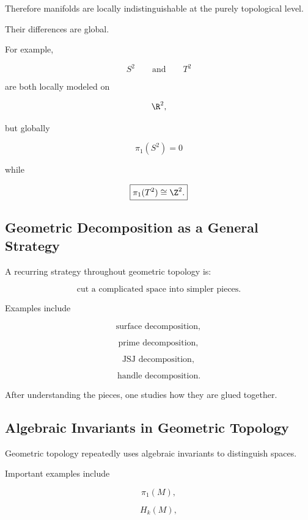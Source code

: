 Therefore manifolds are locally indistinguishable at the purely topological
level.

Their differences are global.

For example,

\[
S^2
\qquad\text{and}\qquad
T^2
\]

are both locally modeled on

\[
\R^2,
\]

but globally

\[
\boxed{
\pi_1(S^2)=0
}
\]

while

\[
\boxed{
\pi_1(T^2)\cong\Z^2.
}
\]

\subsection{Geometric Decomposition as a General Strategy}
\label{subsec:geometric-decomposition-strategy}

A recurring strategy throughout geometric topology is:

\[
\boxed{
\text{cut a complicated space into simpler pieces}.
}
\]

Examples include

\[
\boxed{
\text{surface decomposition},
}
\]

\[
\boxed{
\text{prime decomposition},
}
\]

\[
\boxed{
\text{JSJ decomposition},
}
\]

\[
\boxed{
\text{handle decomposition}.
}
\]

After understanding the pieces, one studies how they are glued together.

\subsection{Algebraic Invariants in Geometric Topology}
\label{subsec:algebraic-invariants-geometric-topology}

Geometric topology repeatedly uses algebraic invariants to distinguish
spaces.

Important examples include

\[
\boxed{
\pi_1(M),
}
\]

\[
\boxed{
H_k(M),
}
\]

